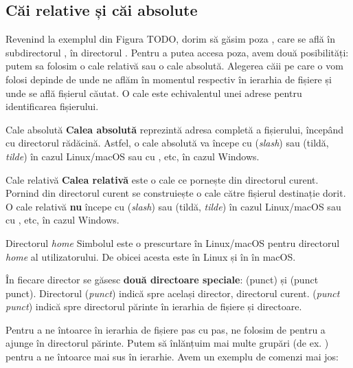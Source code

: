 \subsection{Căi relative și căi absolute}
\label{sec:file-system-baza-paths}

Revenind la exemplul din Figura TODO, dorim să găsim poza
, care se află în subdirectorul , în
directorul . Pentru a putea accesa poza, avem două posibilități: putem
sa folosim o cale relativă sau o cale absolută. Alegerea căii pe care o vom
folosi depinde de unde ne aflăm în momentul respectiv în ierarhia de fișiere și
unde se află fișierul căutat. O cale este echivalentul unei adrese pentru identificarea fișierului.

\begin{definition}{Cale absolută}
\textbf{Calea absolută} reprezintă adresa completă a fișierului, începând cu
directorul rădăcină. Astfel, o cale absolută va începe cu \file{/} (\textit{slash}) sau
\file{\textasciitilde{}} (tildă, \textit{tilde}) în cazul Linux/macOS sau cu , 
etc, în cazul Windows.
\end{definition}

\begin{definition}{Cale relativă}
\textbf{Calea relativă} este o cale ce pornește din directorul curent. Pornind din directorul curent se construiește o cale către fișierul destinație dorit. O cale relativă \textbf{nu} începe cu \file{/} (\textit{slash}) sau
\file{\textasciitilde{}} (tildă, \textit{tilde}) în cazul Linux/macOS sau cu , 
etc, în cazul Windows.
\end{definition}

\begin{note}{Directorul \textit{home}}
Simbolul \file{\textasciitilde{}} este o prescurtare în Linux/macOS pentru directorul \textit{home} al utilizatorului. De obicei acesta este  în Linux și în  în macOS.
\end{note}

În fiecare director se găsesc \textbf{două directoare speciale}:  (punct) și  (punct punct). Directorul  (\textit{punct}) indică spre același director, directorul curent.  (\textit{punct punct}) indică spre directorul părinte în ierarhia de fișiere și directoare.

Pentru a ne întoarce în ierarhia de fișiere pas cu pas, ne folosim de  pentru a ajunge în directorul părinte. Putem să înlănțuim mai multe grupări  (de ex. ) pentru a ne întoarce mai sus în ierarhie. Avem un exemplu de comenzi mai jos:

